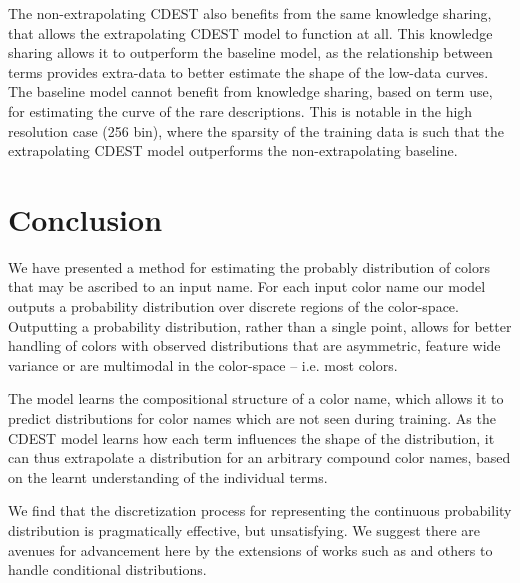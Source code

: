 \documentclass[11pt,a4paper]{article}
\newcommand{\textcite}{\cite}
\begin{document}
The non-extrapolating CDEST also benefits from the same knowledge sharing, that allows the extrapolating CDEST model to function at all.
This knowledge sharing allows it to outperform the baseline model, as the relationship between terms provides extra-data to better estimate the shape of the low-data curves.
The baseline model cannot benefit from knowledge sharing, based on term use, for estimating the curve of the rare descriptions.
This is notable in the high resolution case (256 bin),
where the sparsity of the training data is such that the extrapolating CDEST model outperforms the non-extrapolating baseline.




\section{Conclusion}\label{sec:conclusion}
We have presented a method for estimating the probably distribution of colors that may be ascribed to an input name.
For each input color name our model outputs a probability distribution over discrete regions of the color-space.
Outputting a probability distribution, rather than a single point, allows for better handling of colors with observed distributions that are asymmetric, feature wide variance or are multimodal in the color-space -- i.e. most colors.

The model learns the compositional structure of a color name, which allows it to predict distributions for color names which are not seen during training.
As the CDEST model learns how each term influences the shape of the distribution, it can thus extrapolate a distribution for
 an arbitrary compound color names, based on the learnt understanding of the individual terms.

We find that the discretization process for representing the continuous probability distribution is pragmatically effective, but unsatisfying.
We suggest there are avenues for advancement here by the extensions of works such as \textcite{1998NNpdfDiffCdf, likas2001probability, 2017arXivKernalMixtureNetworks} and others to handle conditional distributions.


\clearpage


\clearpage
\appendix


\end{document}
